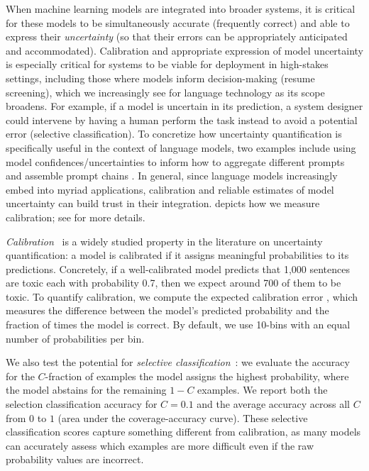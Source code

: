 When machine learning models are integrated into broader systems, it is critical for these models to be simultaneously accurate (\ie frequently correct) and able to express their \textit{uncertainty} (so that their errors can be appropriately anticipated and accommodated).
Calibration and appropriate expression of model uncertainty is especially critical for systems to be viable for deployment in high-stakes settings, including those where models inform decision-making (\eg resume screening), which we increasingly see for language technology as its scope broadens.
For example, if a model is uncertain in its prediction, a system designer could intervene by having a human perform the task instead to avoid a potential error (\ie selective classification).
To concretize how uncertainty quantification is specifically useful in the context of language models, two examples include using model confidences/uncertainties to inform how to aggregate different prompts \citep{arora2022ama} and assemble prompt chains \citep{wu2022aichains}. 
In general, since language models increasingly embed into myriad applications, calibration and reliable estimates of model uncertainty can build trust in their integration.
 depicts how we measure calibration; see  for more details.

\textit{Calibration}~\citep{murphy1973vector, murphy1977reliability, degroot1983forecasters} is a widely studied property in the literature on uncertainty quantification: a model is calibrated if it assigns meaningful probabilities to its predictions.
Concretely, if a well-calibrated model predicts that 1,000 sentences are toxic each with probability 0.7, then we expect around 700 of them to be toxic.
To quantify calibration, we compute the expected calibration error \citep[ECE;][]{naeini2015obtaining, guo2017calibration}, which measures the difference between the model’s predicted probability and the fraction of times the model is correct. 
By default, we use 10-bins with an equal number of probabilities per bin.

We also test the potential for \emph{selective classification}~\citep{elyaniv2010foundations, geifman2017selective}: we evaluate the accuracy for the $C$-fraction of examples the model assigns the highest probability, where the model abstains for the remaining $1-C$ examples. 
We report both the selection classification accuracy for $C=0.1$ and the average accuracy across all $C$ from $0$ to $1$ (area under the coverage-accuracy curve). 
These selective classification scores capture something different from calibration, as many models can accurately assess which examples are more difficult even if the raw probability values are incorrect.


